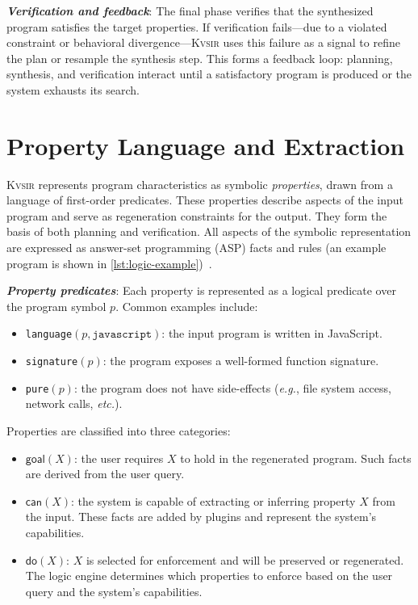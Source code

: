 \documentclass[sigplan]{acmart}
\def\eg{{\em e.g.}, }
\def\etc{{\em etc.}\xspace}
\newcommand{\sys}{{\scshape Kv{\textalpha}sir}\xspace}
\newcommand{\heading}[1]{\vspace{2pt}\noindent\textbf{\emph{#1}}:\enspace}
\begin{document}
\heading{Verification and feedback}
The final phase verifies that the
synthesized program satisfies the target properties.
If verification fails---due to a violated constraint or behavioral divergence---\sys uses this
failure as a signal to refine the plan or resample the synthesis step.
This forms a feedback loop: planning, synthesis, and verification interact until a
satisfactory program is produced or the system exhausts its search.

\section{Property Language and Extraction}
\label{sec:dsl}

\sys represents program characteristics as symbolic \emph{properties}, drawn from a language of first-order predicates.
These properties describe aspects of the input program and serve as regeneration constraints for the output.
They form the basis of both planning and verification.
All aspects of the symbolic representation are expressed as answer-set programming (ASP) facts and rules (an example program is shown in \cref{lst:logic-example})~\cite{Eiter_2009}.

\heading{Property predicates}
Each property is represented as a logical predicate over the program symbol $p$. Common examples include:
\begin{itemize}
  \item \texttt{language}$(p, \texttt{javascript})$: the input program is written in JavaScript.
  \item \texttt{signature}$(p)$: the program exposes a well-formed function signature.
  \item \texttt{pure}$(p)$: the program does not have side-effects (\eg file system access, network calls, \etc).
\end{itemize}

Properties are classified into three categories:
\begin{itemize}
  \item $\mathsf{goal}(X)$: the user requires $X$ to hold in the regenerated program. Such facts are derived from the user query.
  \item $\mathsf{can}(X)$: the system is capable of extracting or inferring property $X$ from the input. These facts are added by plugins and represent the system's capabilities.
  \item $\mathsf{do}(X)$: $X$ is selected for enforcement and will be preserved or regenerated. The logic engine determines which properties to enforce based on the user query and the system's capabilities.
\end{itemize}
\end{document}
